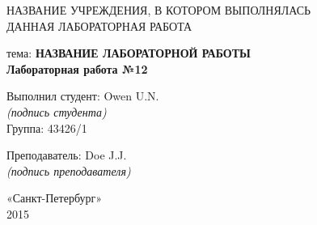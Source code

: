 \begin{titlepage}
  
\begin{center}
	НАЗВАНИЕ УЧРЕЖДЕНИЯ, В КОТОРОМ ВЫПОЛНЯЛАСЬ \\
  ДАННАЯ ЛАБОРАТОРНАЯ РАБОТА \\
\end{center}

\vspace{50mm}
\begin{center}		
  {тема: \bf \large НАЗВАНИЕ ЛАБОРАТОРНОЙ РАБОТЫ \\
	\small Лабораторная работа №12}
\end{center}
	
\vspace{30mm}	
\begin{flushright}
	Выполнил студент: \hspace{2mm} \underline{\hspace{1.2cm}} \hspace{2mm} Owen U.N. \\
	\textit{(подпись студента)} \hspace*{2cm} \\
	Группа:\hspace{0.5cm} 43426/1\par
	\vspace{2mm}
	Преподаватель:\hspace{2mm}  \underline{\hspace{1.2cm}}  \hspace{2mm} Doe J.J.\\
	\textit{(подпись преподавателя)} \hspace*{2cm} \\
\end{flushright}
	
	
\begin{center}
	{«Санкт-Петербург»\\
		2015}
\end{center}
	
\end{titlepage}
\newpage

